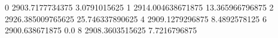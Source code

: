 0 2903.7177734375 3.0791015625
1 2914.004638671875 13.365966796875
2 2926.385009765625 25.746337890625
4 2909.1279296875 8.4892578125
6 2900.638671875 0.0
8 2908.3603515625 7.7216796875
